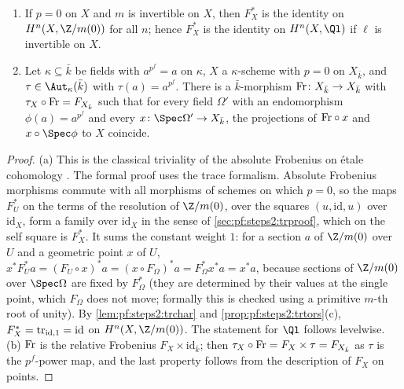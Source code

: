 \begin{lemma}\label{lem:pf:steps2:frob}
\begin{enumerate}[label=\textup{(\alph*)},nosep]
\item If $p=0$ on $X$ and $m$ is invertible on $X$, then $F_X^\ast$ is the identity on
  $H^n(X,\Z/m(0))$ for all $n$; hence $F_X^\ast$ is the identity on $H^n(X,\Ql)$ if $\ell$ is
  invertible on $X$.
\item Let $\kappa\subseteq\bar k$ be fields with $a^{p^f}=a$ on $\kappa$, $X$ a $\kappa$-scheme with $p=0$
  on $X_{\bar k}$, and $\tau\in\Aut_\kappa(\bar k)$ with $\tau(a)=a^{p^f}$. There is a $\bar
  k$-morphism $\mathrm{Fr}\colon X_{\bar k}\to X_{\bar k}$ with $\tau_X\circ\mathrm{Fr}=F_{X_{\bar k}}$
  such that for every field $\Omega'$ with an endomorphism $\phi(a)=a^{p^f}$ and every
  $x\colon\Spec\Omega'\to X_{\bar k}$, the projections of $\mathrm{Fr}\circ x$ and $x\circ\Spec\phi$ to
  $X$ coincide.
\end{enumerate}
\end{lemma}

\begin{proof}
(a) This is the classical triviality of the absolute Frobenius on \'etale cohomology
\cite[Exp.~XV, \S1]{Grothendieck1977}. The formal proof uses the trace formalism. Absolute Frobenius
morphisms commute with all morphisms of schemes on which $p=0$, so the maps $F_U^\ast$ on the terms of
the resolution of $\Z/m(0)$, over the squares $(u,\mathrm{id},u)$ over $\mathrm{id}_X$, form a family
over $\mathrm{id}_X$ in the sense of \cref{sec:pf:steps2:trproof}, which on the self square is
$F_X^\ast$. It sums the constant weight $1$: for a section $a$ of $\Z/m(0)$ over $U$ and a geometric
point $x$ of $U$, $x^\ast F_U^\ast a=(F_U\circ x)^\ast a=(x\circ F_\Omega)^\ast a=F_\Omega^\ast x^\ast a=
x^\ast a$, because sections of $\Z/m(0)$ over $\Spec\Omega$ are fixed by $F_\Omega^\ast$ (they are
determined by their values at the single point, which $F_\Omega$ does not move; formally this is
checked using a primitive $m$-th root of unity). By \cref{lem:pf:steps2:trchar} and
\cref{prop:pf:steps2:trtors}(c), $F_X^\ast=\mathrm{tr}_{\mathrm{id},1}=\mathrm{id}$ on $H^n(X,\Z/m(0))$.
The statement for $\Ql$ follows levelwise. (b) $\mathrm{Fr}$ is the relative Frobenius
$F_X\times\mathrm{id}_{\bar k}$; then $\tau_X\circ\mathrm{Fr}=F_X\times\tau=F_{X_{\bar k}}$ as $\tau$ is
the $p^f$-power map, and the last property follows from the description of $F_X$ on points.
\end{proof}

